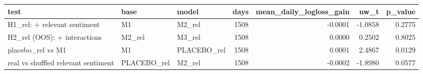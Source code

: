 \begin{tabular}{lllrrrr}
\toprule
test & base & model & days & mean\_daily\_logloss\_gain & nw\_t & p\_value \\
\midrule
H1\_rel: + relevant sentiment & M1 & M2\_rel & 1508 & -0.0001 & -1.0858 & 0.2775 \\
H2\_rel (OOS): + interactions & M2\_rel & M3\_rel & 1508 & 0.0000 & 0.2502 & 0.8025 \\
placebo\_rel vs M1 & M1 & PLACEBO\_rel & 1508 & 0.0001 & 2.4867 & 0.0129 \\
real vs shuffled relevant sentiment & PLACEBO\_rel & M2\_rel & 1508 & -0.0002 & -1.8980 & 0.0577 \\
\bottomrule
\end{tabular}

